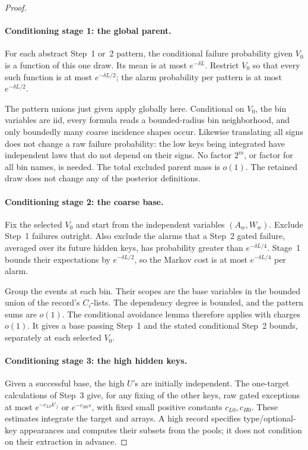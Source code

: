 \begin{proof}
\paragraph{Conditioning stage 1: the global parent.}
For each abstract Step~1 or~2 pattern, the conditional failure probability
given \(V_0\) is a function of this one draw. Its mean is at most
\(e^{-\delta L}\). Restrict \(V_0\) so that every such function is at
most \(e^{-\delta L/2}\); the alarm probability per pattern is at most
\(e^{-\delta L/2}\).

The pattern unions just given apply globally here. Conditional on \(V_0\),
the bin variables are iid, every formula reads a bounded-radius bin
neighborhood, and only boundedly many coarse incidence shapes occur.
Likewise translating all signs does not change a raw failure probability:
the low keys being integrated have independent laws that do not depend
on their signs. No factor \(2^m\), or factor for all bin names, is
needed. The total excluded parent mass is \(o(1)\). The retained draw
does not change any of the posterior definitions.

\paragraph{Conditioning stage 2: the coarse base.}
Fix the selected \(V_0\) and start from the independent variables
\((A_w,W_w)\). Exclude Step~1 failures outright. Also exclude the
alarms that a Step~2 gated failure, averaged over its future hidden keys,
has probability greater than \(e^{-\delta L/4}\). Stage~1 bounds their
expectations by \(e^{-\delta L/2}\), so the Markov cost is at most
\(e^{-\delta L/4}\) per alarm.

Group the events at each bin. Their scopes are the base variables in the
bounded union of the record's \(C_i\)-lists. The dependency degree is
bounded, and the pattern sums are \(o(1)\). The conditional avoidance
lemma therefore applies with charges \(o(1)\). It gives a base passing
Step~1 and the stated conditional Step~2 bounds, separately at each
selected \(V_0\).

\paragraph{Conditioning stage 3: the high hidden keys.}
Given a successful base, the high \(U\)'s are initially independent.
The one-target calculations of Step~3 give, for any fixing of the other
keys, raw gated exceptions at most
\(e^{-c_{L0}k'_j}\) or \(e^{-c_{H0}s}\), with fixed small positive
constants \(c_{L0},c_{H0}\). These estimates integrate the target and
arrays. A high record specifies type/optional-key appearances and
computes their subsets from the pools; it does not condition on their
extraction in advance.


\end{proof}
